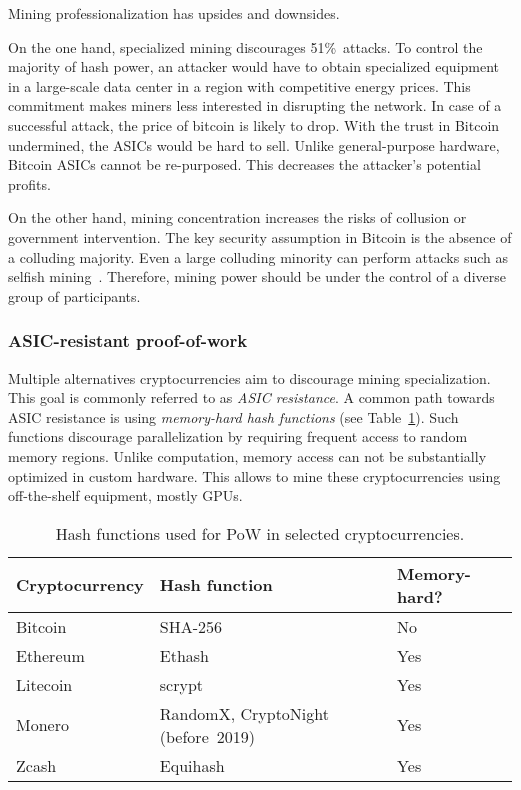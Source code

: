 Mining professionalization has upsides and downsides.

On the one hand, specialized mining discourages 51\%~attacks.
To control the majority of hash power, an attacker would have to obtain specialized equipment in a large-scale data center in a region with competitive energy prices.
This commitment makes miners less interested in disrupting the network.
In case of a successful attack, the price of bitcoin is likely to drop.
With the trust in Bitcoin undermined, the ASICs would be hard to sell.
Unlike general-purpose hardware, Bitcoin ASICs cannot be re-purposed.
This decreases the attacker's potential profits.

On the other hand, mining concentration increases the risks of collusion or government intervention.
The key security assumption in Bitcoin is the absence of a colluding majority.
Even a large colluding minority can perform attacks such as selfish mining~\cite{Eyal2018}.
Therefore, mining power should be under the control of a diverse group of participants.


\subsubsection*{ASIC-resistant proof-of-work}

Multiple alternatives cryptocurrencies aim to discourage mining specialization.
This goal is commonly referred to as \textit{ASIC resistance}.
A common path towards ASIC resistance is using \textit{memory-hard hash functions} (see Table~\ref{tab:pow-coins-hash-functions}).
Such functions discourage parallelization by requiring frequent access to random memory regions.
Unlike computation, memory access can not be substantially optimized in custom hardware.
This allows to mine these cryptocurrencies using off-the-shelf equipment, mostly GPUs.

\begin{table}[]
	\begin{tabular}{|l|l|l|}
		\hline
		\textbf{Cryptocurrency} & \textbf{Hash function} & \textbf{Memory-hard?} \\ \hline
		Bitcoin & SHA-256 & No \\ \hline
		Ethereum & Ethash & Yes \\ \hline
		Litecoin & scrypt & Yes \\ \hline
		Monero & RandomX, CryptoNight (before~2019) & Yes \\ \hline
		Zcash & Equihash & Yes \\ \hline
	\end{tabular}
	\caption{Hash functions used for PoW in selected cryptocurrencies.}
	\label{tab:pow-coins-hash-functions}
\end{table}

